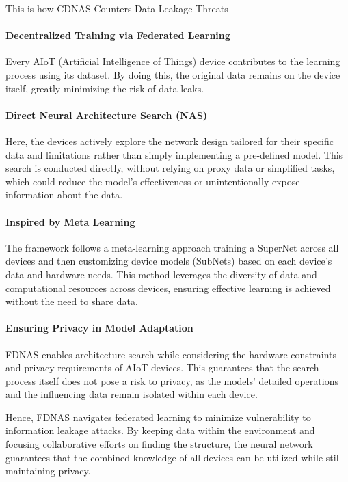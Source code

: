 \documentclass[conference]{IEEEtran}
\begin{document}
This is how CDNAS Counters Data Leakage Threats - 
\paragraph{Decentralized Training via Federated Learning} Every AIoT (Artificial Intelligence of Things) device contributes to the learning process using its dataset. By doing this, the original data remains on the device itself, greatly minimizing the risk of data leaks.
\paragraph{Direct Neural Architecture Search (NAS)} Here, the devices actively explore the network design tailored for their specific data and limitations rather than simply implementing a pre-defined model. This search is conducted directly, without relying on proxy data or simplified tasks, which could reduce the model's effectiveness or unintentionally expose information about the data.

\paragraph{Inspired by Meta Learning} The framework follows a meta-learning approach training a SuperNet across all devices and then customizing device models (SubNets) based on each device's data and hardware needs. This method leverages the diversity of data and computational resources across devices, ensuring effective learning is achieved without the need to share data.

\paragraph{Ensuring Privacy in Model Adaptation} FDNAS enables architecture search while considering the hardware constraints and privacy requirements of AIoT devices. This guarantees that the search process itself does not pose a risk to privacy, as the models' detailed operations and the influencing data remain isolated within each device.

Hence, FDNAS navigates federated learning to minimize vulnerability to information leakage attacks. By keeping data within the environment and focusing collaborative efforts on
finding the structure, the neural network guarantees that the combined knowledge of all devices can be utilized while still maintaining privacy.\\
\end{document}
